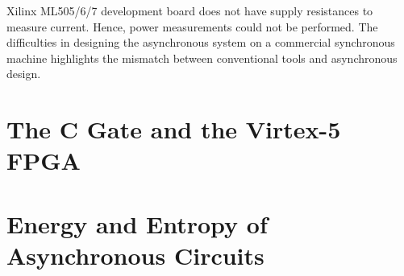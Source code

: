 \documentclass[10pt,journal,compsoc]{IEEEtran}
\begin{document}
Xilinx ML505/6/7 development board does not have supply resistances to measure current. Hence,
power measurements could not be performed. The difficulties in
designing the asynchronous system on a commercial synchronous machine
highlights the mismatch between conventional tools and asynchronous design.

\newpage

\appendices
\section{The C Gate and the Virtex-5 FPGA}


\section{Energy and Entropy of Asynchronous Circuits} \label{appendix_entropy}


\ifCLASSOPTIONcaptionsoff
  \newpage
\fi
\end{document}
